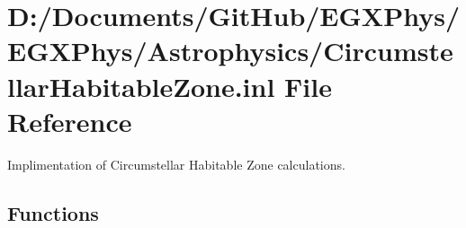 \hypertarget{_circumstellar_habitable_zone_8inl}{}\section{D\+:/\+Documents/\+Git\+Hub/\+E\+G\+X\+Phys/\+E\+G\+X\+Phys/\+Astrophysics/\+Circumstellar\+Habitable\+Zone.inl File Reference}
\label{_circumstellar_habitable_zone_8inl}


Implimentation of Circumstellar Habitable Zone calculations.  


\subsection*{Functions}
